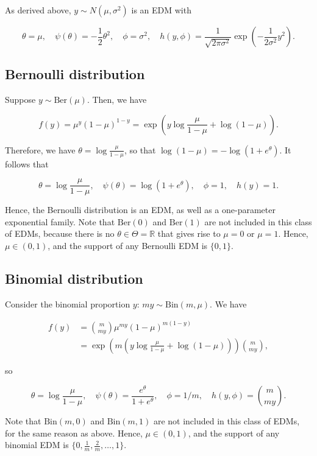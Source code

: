\documentclass[
  11pt,
  letterpaper,
  oneside]{book}
\theoremstyle{plain}
\theoremstyle{plain}
\theoremstyle{definition}
\theoremstyle{definition}
\theoremstyle{plain}
\theoremstyle{remark}
\begin{document}
As derived above, \(y \sim N(\mu, \sigma^2)\) is an EDM with

\[
\theta = \mu, \quad \psi(\theta) = -\frac 12 \theta^2, \quad \phi = \sigma^2, \quad h(y, \phi) = \frac{1}{\sqrt{2\pi \sigma^2}}\exp\left(-\frac1{2\sigma^2} y^2\right).
\]

\hypertarget{bernoulli-distribution}{%
\subsection{Bernoulli distribution}\label{bernoulli-distribution}}

Suppose \(y \sim \text{Ber}(\mu)\). Then, we have

\[
f(y) = \mu^{y}(1-\mu)^{1-y} = \exp\left(y \log \frac{\mu}{1-\mu} + \log(1-\mu) \right).
\]

Therefore, we have \(\theta = \log \frac{\mu}{1-\mu}\), so that
\(\log(1-\mu) = -\log(1+e^\theta)\). It follows that

\[
\theta = \log \frac{\mu}{1-\mu}, \quad \psi(\theta) = \log(1+e^\theta), \quad \phi = 1, \quad h(y) = 1.
\]

Hence, the Bernoulli distribution is an EDM, as well as a one-parameter
exponential family. Note that \(\text{Ber}(0)\) and \(\text{Ber}(1)\)
are not included in this class of EDMs, because there is no
\(\theta \in \Theta = \mathbb{R}\) that gives rise to \(\mu = 0\) or
\(\mu = 1\). Hence, \(\mu \in (0,1)\), and the support of any Bernoulli
EDM is \(\{0,1\}\).

\hypertarget{binomial-distribution}{%
\subsection{Binomial distribution}\label{binomial-distribution}}

Consider the binomial proportion \(y\): \(my \sim \text{Bin}(m, \mu)\).
We have

\[
\begin{split}
f(y) &= {m \choose my}\mu^{my}(1-\mu)^{m(1-y)} \\
&= \exp\left(m\left(y \log \frac{\mu}{1-\mu} + \log(1-\mu)\right)\right){m \choose my},
\end{split}
\]

so

\[
\theta = \log\frac{\mu}{1-\mu}, \quad \psi(\theta) = \frac{e^{\theta}}{1 + e^{\theta}}, \quad \phi = 1/m, \quad h(y, \phi) = {m \choose my}.
\]

Note that \(\text{Bin}(m, 0)\) and \(\text{Bin}(m, 1)\) are not included
in this class of EDMs, for the same reason as above. Hence,
\(\mu \in (0,1)\), and the support of any binomial EDM is
\(\{0,\frac{1}{m}, \frac{2}{m}, \dots, 1\}\).
\end{document}
